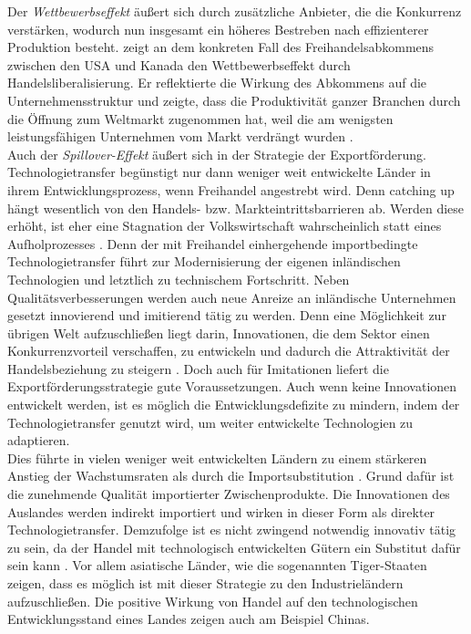 %
Der \textit{Wettbewerbseffekt} äußert sich durch zusätzliche Anbieter, die die Konkurrenz verstärken, wodurch nun insgesamt ein höheres Bestreben nach effizienterer Produktion besteht. \cite{Trefler.2004} zeigt an dem konkreten Fall des Freihandelsabkommens zwischen den USA und Kanada den Wettbewerbseffekt durch Handelsliberalisierung. Er reflektierte die Wirkung des Abkommens auf die Unternehmensstruktur und zeigte, dass die Produktivität ganzer Branchen durch die Öffnung zum Weltmarkt zugenommen hat, weil die am wenigsten leistungsfähigen Unternehmen vom Markt verdrängt wurden \cite{Trefler.2004}.\\
%
Auch der \textit{Spillover-Effekt} äußert sich in der Strategie der Exportförderung.  Technologietransfer begünstigt nur dann weniger weit entwickelte Länder in ihrem Entwicklungsprozess, wenn Freihandel angestrebt wird. Denn catching up hängt wesentlich von den Handels- bzw. Markteintrittsbarrieren ab. Werden diese erhöht, ist eher eine Stagnation der Volkswirtschaft wahrscheinlich statt eines Aufholprozesses \cite{Stokey.2015}. Denn der mit Freihandel einhergehende importbedingte Technologietransfer führt zur Modernisierung der eigenen inländischen Technologien und letztlich zu technischem Fortschritt.
Neben Qualitätsverbesserungen werden auch neue Anreize  an inländische Unternehmen gesetzt innovierend und imitierend tätig zu werden. Denn eine Möglichkeit zur übrigen Welt aufzuschließen liegt darin, Innovationen, die dem Sektor einen Konkurrenzvorteil verschaffen, zu entwickeln und dadurch die Attraktivität der Handelsbeziehung zu steigern \cite{Muller.2005}. Doch auch für Imitationen liefert die Exportförderungsstrategie gute Voraussetzungen. Auch wenn keine Innovationen entwickelt werden, ist es möglich die Entwicklungsdefizite zu mindern, indem der Technologietransfer genutzt wird, um weiter entwickelte Technologien zu adaptieren.\\
%
Dies führte in vielen weniger weit entwickelten Ländern zu einem stärkeren Anstieg der Wachstumsraten als durch die Importsubstitution \cite{Krugman.2015}. Grund dafür ist die zunehmende Qualität importierter Zwischenprodukte. Die Innovationen des Auslandes werden indirekt importiert und wirken in dieser Form als direkter Technologietransfer. Demzufolge ist es nicht zwingend notwendig innovativ tätig zu sein, da der Handel mit technologisch entwickelten Gütern ein Substitut dafür sein kann \cite{Keller.2004}. Vor allem asiatische Länder, wie die sogenannten Tiger-Staaten zeigen, dass es möglich ist mit dieser Strategie zu den Industrieländern aufzuschließen. Die positive Wirkung von Handel auf den technologischen Entwicklungsstand eines Landes zeigen auch \cite{Bloom.2011} am Beispiel Chinas.\\
